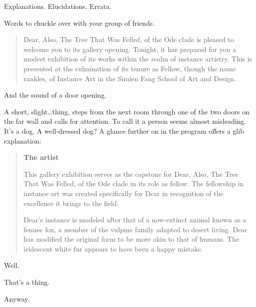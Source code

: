 Explanations. Elucidations. Errata.

Words to chuckle over with your group of friends.

\begin{quote}
Dear, Also, The Tree That Was Felled, of the Ode clade is pleased to welcome you to its gallery opening. Tonight, it has prepared for you a modest exhibition of its works within the realm of instance artistry. This is presented at the culmination of its tenure as Fellow, though the name rankles, of Instance Art in the Simien Fang School of Art and Design.
\end{quote}

And the sound of a door opening.

\vfill

\newpage
\null
\vfill

\noindent A short, slight\ldots{}thing, steps from the next room through one of the two doors on the far wall and calls for attention. To call it a person seems almost misleading. It's a dog. A well-dressed dog? A glance further on in the program offers a glib explanation:

\begin{quote}
\textbf{The artist}

This gallery exhibition serves as the capstone for Dear, Also, The Tree That Was Felled, of the Ode clade in its role as fellow. The fellowship in instance art was created specifically for Dear in recognition of the excellence it brings to the field.

Dear's instance is modeled after that of a now-extinct animal known as a fennec fox, a member of the vulpine family adapted to desert living. Dear has modified the original form to be more akin to that of humans. The iridescent white fur appears to have been a happy mistake.
\end{quote}

\vfill
\newpage

\null
\vfill

\noindent Well.

\null
\vfill

\newpage

\null
\vfill

\noindent That's a thing.

\null
\vfill

\newpage

\null
\vfill

\noindent Anyway.

